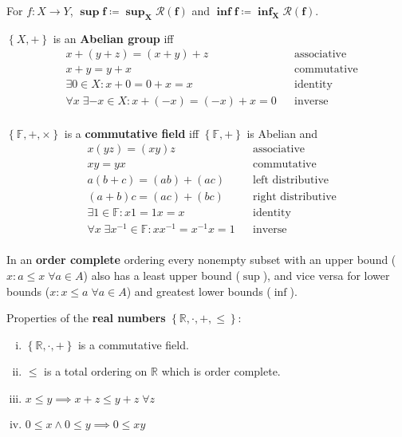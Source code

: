 \documentclass[letterpaper,11pt]{amsart}
\newcommand{\reals}{\mathbb{R}}
\newcommand{\keyphrase}[1]{\textbf{#1}}
\begin{document}
For $f:X\to{}Y$,
$\boldsymbol{\sup f \coloneqq \sup_{X} \mathcal{R}(f)}$ and
$\boldsymbol{\inf f \coloneqq \inf_{X} \mathcal{R}(f)}$.

$\left\{ X,+ \right\}$ is an \keyphrase{Abelian group} iff
\begin{align*}
    &x+(y+z)=(x+y)+z
    & &\text{associative} \\
    &x+y = y+x
    & &\text{commutative} \\
    &\exists 0 \in X : x+0 = 0+x = x
    & &\text{identity} \\
    &\forall x \; \exists -x \in X : x+(-x)=(-x)+x=0
    & &\text{inverse} \\
\end{align*}

$\left\{ \mathbb{F},+,\times \right\}$
is a \keyphrase{commutative field} iff $\left\{ \mathbb{F}, + \right\}$ 
is Abelian and
\begin{align*}
    & x (y z)=(x y) z
    & &\text{associative} \\
    & x y = y x
    & &\text{commutative} \\
    & a (b+c) = (a b) + (a c)
    & &\text{left distributive} \\
    & (a+b) c = (a c) + (b c)
    & &\text{right distributive} \\
    & \exists 1 \in \mathbb{F} : x 1=1 x=x
    & &\text{identity} \\
    & \forall x \; \exists x^{-1} \in \mathbb{F} :
        x x^{-1}= x^{-1} x=1
    & &\text{inverse} \\
\end{align*}

In an \keyphrase{order complete} ordering every nonempty subset
with an upper bound ($x : a\leq{}x \; \forall a \in A$)
also has a least upper bound ($\sup$), and vice versa for
lower bounds ($x : x\leq{}a \; \forall a \in A$)
and greatest lower bounds ($\inf$).

Properties of the \keyphrase{real numbers}
$\left\{ \reals{}, \cdot, +, \leq \right\}$:
\begin{enumerate}[(i)]
    \item $\left\{ \reals{}, \cdot, + \right\}$ is a commutative field.
    \item $\leq$ is a total ordering on $\reals{}$ which is order complete.
    \item $x\leq{}y \implies x+z\leq{}y+z \; \forall z$
    \item $0\leq{}x \wedge 0 \leq{}y \implies 0\leq{}xy$
\end{enumerate}
\end{document}

